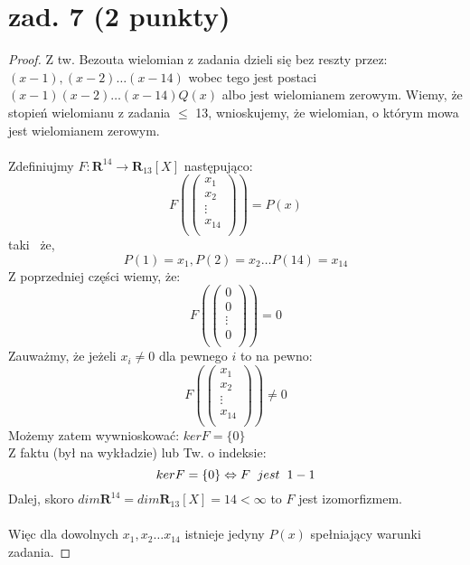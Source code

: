 \documentclass{article}
\begin{document}
\section{zad. 7 (2 punkty)}
\begin{proof}
Z tw. Bezouta wielomian z zadania dzieli się bez reszty przez:
$(x-1), (x-2) \dots (x-14)$ wobec tego jest postaci $(x-1)(x-2)\dots(x-14)Q(x)$ albo jest wielomianem zerowym. Wiemy, że stopień wielomianu z zadania $\leq$ 13, wnioskujemy, że wielomian, o którym mowa jest wielomianem zerowym.
\\\\
Zdefiniujmy $F: \textbf{R}^{14} \rightarrow \textbf{R}_{13}[X] $ następująco:
$$
F\left(\begin{pmatrix}
            x_1\\
            x_2\\
            \vdots\\
            x_{14}\\
           \end{pmatrix}\right)
           =
           P(x)
$$
taki  że,
$$
P(1) = x_1,
P(2) = x_2 \dots P(14) = x_{14}
$$
Z poprzedniej części wiemy, że:
$$
F\left(\begin{pmatrix}
            0\\
            0\\
            \vdots\\
            0\\
           \end{pmatrix}\right)
           =
           0
$$
Zauważmy, że jeżeli $x_i \neq 0$ dla pewnego $i$ to na pewno:
$$
F\left(\begin{pmatrix}
            x_1\\
            x_2\\
            \vdots\\
            x_{14}\\
           \end{pmatrix}\right)
           \neq
           0
$$
Możemy zatem wywnioskować: $ker F = \{0\}$
\\
Z faktu (był na wykładzie) lub Tw. o indeksie:
$$
kerF = \{0\} \Leftrightarrow F \hspace{0.2cm} jest \hspace{0.2cm} 1-1
$$
Dalej, skoro $dim \textbf{R}^{14} = dim \textbf{R}_{13}[X] = 14 < \infty$ to $F$ jest izomorfizmem.
\\\\
Więc dla dowolnych $x_1,x_2 \dots x_{14}$ istnieje jedyny $P(x)$ spełniający warunki zadania.
\end{proof}
\end{document}
